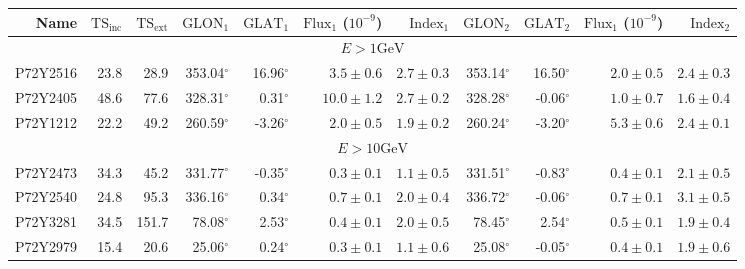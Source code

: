 \documentclass[preprint]{aastex}
\newcommand{\gev}{\text{GeV}\xspace}
\newcommand{\tsext}{{\ensuremath{\text{TS}_\text{ext}}}\xspace}
\newcommand{\tsinc}{\ensuremath{\text{TS}_\text{inc}}\xspace}
\newcommand{\glon}{\text{GLON}\xspace}
\newcommand{\glat}{\text{GLAT}\xspace}
\renewcommand{\deg}{\ensuremath{^\circ}\xspace}
\begin{document}
\clearpage
\begin{table}
    \begin{centering}
      \begin{tabular}{r|rr|rrrr|rrrr}
        \hline
        \hline
        Name                 &     \tsinc &     \tsext &      $\glon_1$ &      $\glat_1$ & $\text{Flux}_1$ ($10^{-9}$) &   $\text{Index}_1$ &      $\glon_2$ &      $\glat_2$ & $\text{Flux}_1$ ($10^{-9}$) &  $\text{Index}_2$ \\
        \hline
        \multicolumn{11}{c}{$E > 1\gev$} \\
        \hline
        P72Y2516             &       23.8 &       28.9 &     353.04\deg &      16.96\deg & $       3.5 \pm        0.6$ & $  2.7 \pm   0.3$  &     353.14\deg &      16.50\deg & $       2.0 \pm        0.5$ & $  2.4 \pm   0.3$ \\
        P72Y2405             &       48.6 &       77.6 &     328.31\deg &       0.31\deg & $      10.0 \pm        1.2$ & $  2.7 \pm   0.2$  &     328.28\deg &      -0.06\deg & $       1.0 \pm        0.7$ & $  1.6 \pm   0.4$ \\
        P72Y1212             &       22.2 &       49.2 &     260.59\deg &      -3.26\deg & $       2.0 \pm        0.5$ & $  1.9 \pm   0.2$  &     260.24\deg &      -3.20\deg & $       5.3 \pm        0.6$ & $  2.4 \pm   0.1$ \\
        \hline
        \multicolumn{11}{c}{$E > 10\gev$} \\
        \hline
        P72Y2473             &       34.3 &       45.2 &     331.77\deg &      -0.35\deg & $       0.3 \pm        0.1$ & $  1.1 \pm   0.5$  &     331.51\deg &      -0.83\deg & $       0.4 \pm        0.1$ & $  2.1 \pm   0.5$ \\
        P72Y2540             &       24.8 &       95.3 &     336.16\deg &       0.34\deg & $       0.7 \pm        0.1$ & $  2.0 \pm   0.4$  &     336.72\deg &      -0.06\deg & $       0.7 \pm        0.1$ & $  3.1 \pm   0.5$ \\
        P72Y3281             &       34.5 &      151.7 &      78.08\deg &       2.53\deg & $       0.4 \pm        0.1$ & $  2.0 \pm   0.5$  &      78.45\deg &       2.54\deg & $       0.5 \pm        0.1$ & $  1.9 \pm   0.4$ \\
        P72Y2979             &       15.4 &       20.6 &      25.06\deg &       0.24\deg & $       0.3 \pm        0.1$ & $  1.1 \pm   0.6$  &      25.08\deg &      -0.05\deg & $       0.4 \pm        0.1$ & $  1.9 \pm   0.6$ \\

\end{tabular}
\end{centering}
\end{table}
\end{document}
